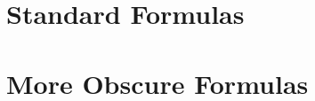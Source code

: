 \section{Standard Formulas}

\makeatletter
\let\actuallabel\label
\makeatother
\renewcommand{\label}[1]{
}
\renewcommand{\label}[1]{\label{#1}}


\section{More Obscure Formulas}

